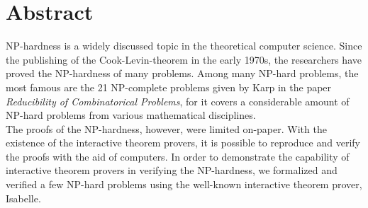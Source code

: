 \newcommand{\abstractname}{Abstract}


\chapter{\abstractname}

NP-hardness is a widely discussed topic in the theoretical computer science. Since the publishing of the Cook-Levin-theorem in the early 1970s, the researchers have proved the NP-hardness of many problems. Among many NP-hard problems, the most famous are the 21 NP-complete problems given by Karp in the paper \textit{Reducibility of Combinatorical Problems}, for it covers a considerable amount of NP-hard problems from various mathematical disciplines. \\
The proofs of the NP-hardness, however, were limited on-paper. With the existence of the interactive theorem provers, it is possible to reproduce and verify the proofs with the aid of computers. In order to demonstrate the capability of interactive theorem provers in verifying the NP-hardness, we formalized and verified a few NP-hard problems using the well-known interactive theorem prover, Isabelle.